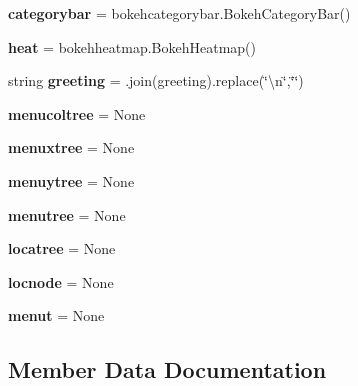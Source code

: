 \begin{DoxyCompactItemize}
{\bfseries categorybar} = bokehcategorybar.\+Bokeh\+Category\+Bar()
\item 
\mbox{\label{classapp_1_1main_1_1boks_1_1Boks_acf295f36cfe7ceb99a049fd7bbab840d}} 
{\bfseries heat} = bokehheatmap.\+Bokeh\+Heatmap()
\item 
\mbox{\label{classapp_1_1main_1_1boks_1_1Boks_ae1094117f1478a1e543996e04f375784}} 
string {\bfseries greeting} = \textquotesingle{}\textquotesingle{}.join(greeting).replace(\char`\"{}\textbackslash{}n\char`\"{},\char`\"{}\char`\"{})
\item 
\mbox{\label{classapp_1_1main_1_1boks_1_1Boks_a8245b3488e844577628fd279e1eb83d9}} 
{\bfseries menucoltree} = None
\item 
\mbox{\label{classapp_1_1main_1_1boks_1_1Boks_a583153e3fc5a2e3aa7d8a3a590107b4e}} 
{\bfseries menuxtree} = None
\item 
\mbox{\label{classapp_1_1main_1_1boks_1_1Boks_a044312bc393249e64e708c2d8a51adf8}} 
{\bfseries menuytree} = None
\item 
\mbox{\label{classapp_1_1main_1_1boks_1_1Boks_a7a9ef5a0f2412ef57784799f5af2c72f}} 
{\bfseries menutree} = None
\item 
\mbox{\label{classapp_1_1main_1_1boks_1_1Boks_a8b3e81c3cfae68f3f8fa6dbd134a6829}} 
{\bfseries locatree} = None
\item 
\mbox{\label{classapp_1_1main_1_1boks_1_1Boks_acdc85a52a609e34907e91eab32539af7}} 
{\bfseries locnode} = None
\item 
\mbox{\label{classapp_1_1main_1_1boks_1_1Boks_a56f4d3de4ff53aad85dcb9069eb310a9}} 
{\bfseries menut} = None
\end{DoxyCompactItemize}


\subsection{Member Data Documentation}
\mbox{\label{classapp_1_1main_1_1boks_1_1Boks_a9fca61dce81ef716bbe04922482878c8}} 
